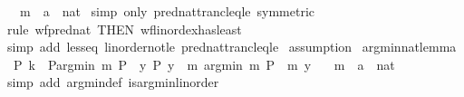 \begin{isabellebody}
\ \ \ m\ {\isacharcolon}{\kern0pt}{\isacharcolon}{\kern0pt}\ {\isachardoublequoteopen}{\isacharprime}{\kern0pt}a\ {\isasymRightarrow}\ nat{\isachardoublequoteclose}\isanewline
%
\isadelimproof
%
\endisadelimproof
%
\isatagproof
{}\isamarkupfalse%
\ {\isacharparenleft}{\kern0pt}simp\ only{\isacharcolon}{\kern0pt}\ pred{\isacharunderscore}{\kern0pt}nat{\isacharunderscore}{\kern0pt}trancl{\isacharunderscore}{\kern0pt}eq{\isacharunderscore}{\kern0pt}le\ {\isacharbrackleft}{\kern0pt}symmetric{\isacharbrackright}{\kern0pt}{\isacharparenright}{\kern0pt}\isanewline
{}\isamarkupfalse%
\ {\isacharparenleft}{\kern0pt}rule\ wf{\isacharunderscore}{\kern0pt}pred{\isacharunderscore}{\kern0pt}nat\ {\isacharbrackleft}{\kern0pt}THEN\ wf{\isacharunderscore}{\kern0pt}linord{\isacharunderscore}{\kern0pt}ex{\isacharunderscore}{\kern0pt}has{\isacharunderscore}{\kern0pt}least{\isacharbrackright}{\kern0pt}{\isacharparenright}{\kern0pt}\isanewline
\ \isamarkupfalse%
\ {\isacharparenleft}{\kern0pt}simp\ add{\isacharcolon}{\kern0pt}\ less{\isacharunderscore}{\kern0pt}eq\ linorder{\isacharunderscore}{\kern0pt}not{\isacharunderscore}{\kern0pt}le\ pred{\isacharunderscore}{\kern0pt}nat{\isacharunderscore}{\kern0pt}trancl{\isacharunderscore}{\kern0pt}eq{\isacharunderscore}{\kern0pt}le{\isacharparenright}{\kern0pt}\isanewline
{}\isamarkupfalse%
\ assumption%
\endisatagproof
{\isafoldproof}%
%
\isadelimproof
\isanewline
%
\endisadelimproof
\isanewline
{}\isamarkupfalse%
\ arg{\isacharunderscore}{\kern0pt}min{\isacharunderscore}{\kern0pt}nat{\isacharunderscore}{\kern0pt}lemma{\isacharcolon}{\kern0pt}\isanewline
\ \ {\isachardoublequoteopen}P\ k\ {\isasymLongrightarrow}\ P{\isacharparenleft}{\kern0pt}arg{\isacharunderscore}{\kern0pt}min\ m\ P{\isacharparenright}{\kern0pt}\ {\isasymand}\ {\isacharparenleft}{\kern0pt}{\isasymforall}y{\isachardot}{\kern0pt}\ P\ y\ {\isasymlongrightarrow}\ m\ {\isacharparenleft}{\kern0pt}arg{\isacharunderscore}{\kern0pt}min\ m\ P{\isacharparenright}{\kern0pt}\ {\isasymle}\ m\ y{\isacharparenright}{\kern0pt}{\isachardoublequoteclose}\isanewline
\ \ \ m\ {\isacharcolon}{\kern0pt}{\isacharcolon}{\kern0pt}\ {\isachardoublequoteopen}{\isacharprime}{\kern0pt}a\ {\isasymRightarrow}\ nat{\isachardoublequoteclose}\isanewline
%
\isadelimproof
%
\endisadelimproof
%
\isatagproof
{}\isamarkupfalse%
\ {\isacharparenleft}{\kern0pt}simp\ add{\isacharcolon}{\kern0pt}\ arg{\isacharunderscore}{\kern0pt}min{\isacharunderscore}{\kern0pt}def\ is{\isacharunderscore}{\kern0pt}arg{\isacharunderscore}{\kern0pt}min{\isacharunderscore}{\kern0pt}linorder{\isacharparenright}{\kern0pt}\isanewline

\end{isabellebody}

